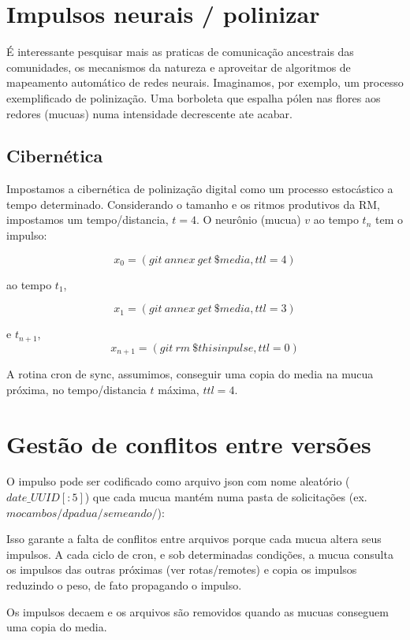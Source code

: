 \section{Impulsos neurais / polinizar}
É interessante pesquisar mais as praticas de comunicação ancestrais
das comunidades, os mecanismos da natureza e aproveitar de algoritmos
de mapeamento automático de redes neurais. Imaginamos, por exemplo, um
processo exemplificado de polinização. Uma borboleta que espalha pólen
nas flores aos redores (mucuas) numa intensidade decrescente ate
acabar.

\subsection{Cibernética}
Impostamos a cibernética de polinização digital como um processo
estocástico a tempo determinado. Considerando o tamanho e os ritmos
produtivos da RM, impostamos um tempo/distancia, $t=4$. O neurônio (mucua)
$v$ ao tempo $t_{n}$ tem o impulso:

$$
x_0 = (git \ annex \ get \ \$media, ttl=4) 
$$

ao tempo $t_{1}$,

$$
x_1 = (git \ annex \ get \ \$media, ttl=3)
$$

e $t_{n+1}$,
$$
x_{n+1} = (git \ rm  \ \$thisinpulse, ttl=0)
$$

A rotina cron de sync, assumimos, conseguir uma copia do media na
mucua próxima, no tempo/distancia $t$ máxima, $ttl=4$.

\section{Gestão de conflitos entre versões}

O impulso pode ser codificado como arquivo json com nome aleatório
($date\_UUID[:5]$) que cada mucua mantém numa pasta de solicitações
(ex. $mocambos/dpadua/semeando/$):


Isso garante a falta de conflitos entre arquivos porque cada mucua
altera seus impulsos. A cada ciclo de cron, e sob determinadas
condições, a mucua consulta os impulsos das outras próximas (ver
rotas/remotes) e copia os impulsos reduzindo o peso, de fato
propagando o impulso.

Os impulsos decaem e os arquivos são removidos quando as mucuas
conseguem uma copia do media.  

